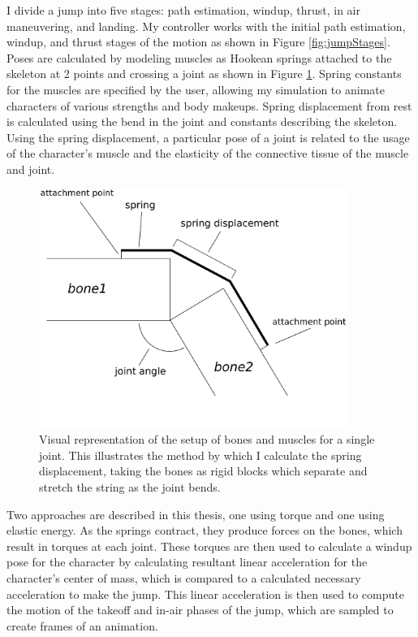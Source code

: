 I divide a jump into five stages: path estimation, windup, thrust, in air maneuvering, and landing. My controller works with the initial path estimation, windup, and thrust stages of the motion as shown in Figure \ref{fig:jumpStages}.  Poses are  calculated by modeling muscles as Hookean springs attached to the skeleton at 2 points and crossing a joint as shown in Figure \ref{fig:forceCalc}. Spring constants for the muscles are specified by the user, allowing my simulation to animate characters of various strengths and body makeups.  Spring displacement from rest is calculated using the bend in the joint and constants describing the skeleton.  Using the spring displacement, a particular pose of a joint is related to the usage of the character's muscle and the elasticity of the connective tissue of the muscle and joint.

\begin{figure}[ht]
	\centering
	\includegraphics[width=10cm]{images/spring_calc/spring_angle_calc.eps}
	\caption[Diagram of muscle setup]{Visual representation of the setup of bones and muscles for a single joint.  This illustrates the method by which I calculate the spring displacement, taking the bones as rigid blocks which separate and stretch the string as the joint bends.}
	\label{fig:forceCalc}
\end{figure}

Two approaches are described in this thesis, one using torque and one using elastic energy.  As the springs contract, they produce forces on the bones, which result in torques at each joint.  These torques are then used to calculate a windup pose for the character by calculating resultant linear acceleration for the character's center of mass, which is compared to a calculated necessary acceleration to make the jump.  This linear acceleration is then used to compute the motion of the takeoff and in-air phases of the jump, which are sampled to create frames of an animation.  

